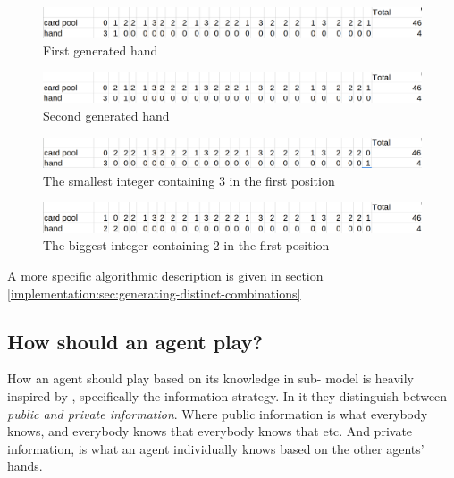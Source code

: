\begin{figure}
	\centering
\includegraphics[width=13cm,frame]{images/biggest_integer.png}
	\caption{First generated hand}
	\label{fig:biggest-integer}
\end{figure}

\begin{figure}
	\centering
\includegraphics[width=13cm,frame]{images/next-biggest.png}
	\caption{Second generated hand}
	\label{fig:next-integer}
\end{figure}

\begin{figure}
	\centering
\includegraphics[width=13cm,frame]{images/etc_one.png}
	\caption{The smallest integer containing 3 in the first position}
	\label{fig:etc-one}
\end{figure}


\begin{figure}
	\centering
\includegraphics[width=13cm,frame]{images/decrement.png}
	\caption{The biggest integer containing 2 in the first position}
	\label{fig:decrement}
\end{figure}


A more specific algorithmic description is given in section \ref{implementation:sec:generating-distinct-combinations}

\subsection{How should an agent play?} \label{sec:how-should-an-agent-play}

How an agent should play based on its knowledge in sub-\SfiveN{} model is heavily inspired by \cite{CoxEtAl2015}, specifically the information strategy. 
In it they distinguish between \emph{public and private information}.
Where public information is what everybody knows, and everybody knows that everybody knows that etc.
And private information, is what an agent individually knows based on the other agents' hands.

